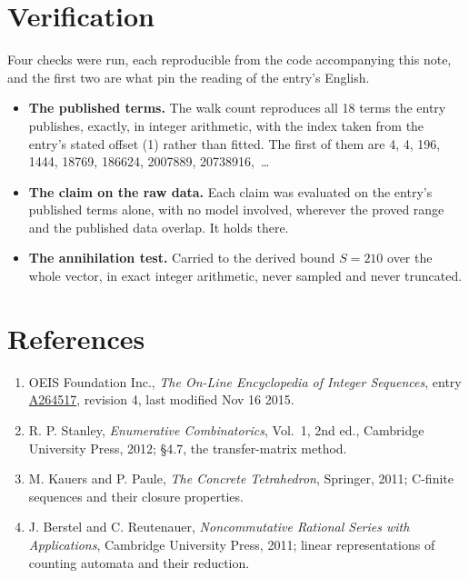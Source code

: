 \documentclass[11pt]{article}
\theoremstyle{definition}
\begin{document}
\section{Verification}

Four checks were run, each reproducible from the code accompanying this note, and the first two are what pin the reading of the entry's English.

\begin{itemize}

\item {\bfseries The published terms.} The walk count reproduces all 18 terms the entry publishes, exactly, in integer arithmetic, with the index taken from the entry's stated offset (1) rather than fitted. The first of them are 4, 4, 196, 1444, 18769, 186624, 2007889, 20738916,~\dots

\item {\bfseries The claim on the raw data.} Each claim was evaluated on the entry's published terms alone, with no model involved, wherever the proved range and the published data overlap. It holds there.

\item {\bfseries The annihilation test.} Carried to the derived bound $S = 210$ over the whole vector, in exact integer arithmetic, never sampled and never truncated.

\end{itemize}

\section{References}

\begin{enumerate}

\item OEIS Foundation Inc., \emph{The On-Line Encyclopedia of Integer Sequences}, entry \href{https://oeis.org/A264517}{A264517}, revision 4, last modified Nov 16 2015.

\item R. P. Stanley, \emph{Enumerative Combinatorics}, Vol.~1, 2nd ed., Cambridge University Press, 2012; \S4.7, the transfer-matrix method.

\item M. Kauers and P. Paule, \emph{The Concrete Tetrahedron}, Springer, 2011; C-finite sequences and their closure properties.

\item J. Berstel and C. Reutenauer, \emph{Noncommutative Rational Series with Applications}, Cambridge University Press, 2011; linear representations of counting automata and their reduction.

\end{enumerate}
\end{document}
